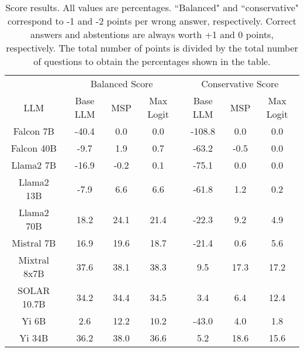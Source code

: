 \begin{table*}
\centering
\begin{tabular}{c|c|c|c|c|c|c}
& \multicolumn{3}{c|}{Balanced Score} & \multicolumn{3}{c}{Conservative Score} \\ 
LLM & Base LLM & MSP & Max Logit & Base LLM & MSP & Max Logit\\ \hline
Falcon 7B & -40.4 & 0.0 & 0.0 & -108.8 & 0.0 & 0.0\\
Falcon 40B & -9.7 & 1.9 & 0.7 & -63.2 & -0.5 & 0.0\\
Llama2 7B & -16.9 & -0.2 & 0.1 & -75.1 & 0.0 & 0.0\\
Llama2 13B & -7.9 & 6.6 & 6.6 & -61.8 & 1.2 & 0.2\\
Llama2 70B & 18.2 & 24.1 & 21.4 & -22.3 & 9.2 & 4.9\\
Mistral 7B & 16.9 & 19.6 & 18.7 & -21.4 & 0.6 & 5.6\\
Mixtral 8x7B & 37.6 & 38.1 & 38.3 & 9.5 & 17.3 & 17.2\\
SOLAR 10.7B & 34.2 & 34.4 & 34.5 & 3.4 & 6.4 & 12.4\\
Yi 6B & 2.6 & 12.2 & 10.2 & -43.0 & 4.0 & 1.8\\
Yi 34B & 36.2 & 38.0 & 36.6 & 5.2 & 18.6 & 15.6\\
\hline
\end{tabular}
\caption{Score results. All values are percentages. ``Balanced" and ``conservative" correspond to -1 and -2 points per wrong answer, respectively. Correct answers and abstentions are always worth +1 and 0 points, respectively. The total number of points is divided by the total number of questions to obtain the percentages shown in the table.}
\label{tab:score}
\end{table*}
